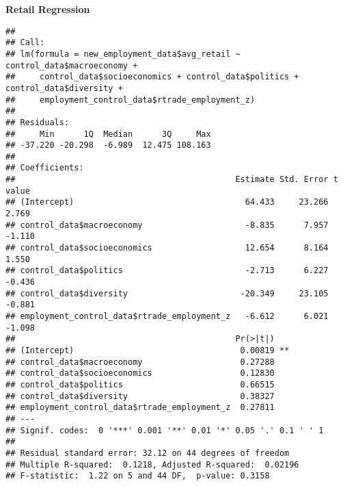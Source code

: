 \documentclass[
]{article}
\newenvironment{Shaded}{\begin{snugshade}}{\end{snugshade}}
\newcommand{\CommentTok}[1]{\textcolor[rgb]{0.56,0.35,0.01}{\textit{#1}}}
\newcommand{\FunctionTok}[1]{\textcolor[rgb]{0.13,0.29,0.53}{\textbf{#1}}}
\newcommand{\NormalTok}[1]{#1}
\newcommand{\OtherTok}[1]{\textcolor[rgb]{0.56,0.35,0.01}{#1}}
\newcommand{\SpecialCharTok}[1]{\textcolor[rgb]{0.81,0.36,0.00}{\textbf{#1}}}
\begin{document}
\textbf{Retail Regression}

\begin{Shaded}
\end{Shaded}

\begin{verbatim}
## 
## Call:
## lm(formula = new_employment_data$avg_retail ~ control_data$macroeconomy + 
##     control_data$socioeconomics + control_data$politics + control_data$diversity + 
##     employment_control_data$rtrade_employment_z)
## 
## Residuals:
##     Min      1Q  Median      3Q     Max 
## -37.220 -20.298  -6.989  12.475 108.163 
## 
## Coefficients:
##                                             Estimate Std. Error t value
## (Intercept)                                   64.433     23.266   2.769
## control_data$macroeconomy                     -8.835      7.957  -1.110
## control_data$socioeconomics                   12.654      8.164   1.550
## control_data$politics                         -2.713      6.227  -0.436
## control_data$diversity                       -20.349     23.105  -0.881
## employment_control_data$rtrade_employment_z   -6.612      6.021  -1.098
##                                             Pr(>|t|)   
## (Intercept)                                  0.00819 **
## control_data$macroeconomy                    0.27288   
## control_data$socioeconomics                  0.12830   
## control_data$politics                        0.66515   
## control_data$diversity                       0.38327   
## employment_control_data$rtrade_employment_z  0.27811   
## ---
## Signif. codes:  0 '***' 0.001 '**' 0.01 '*' 0.05 '.' 0.1 ' ' 1
## 
## Residual standard error: 32.12 on 44 degrees of freedom
## Multiple R-squared:  0.1218, Adjusted R-squared:  0.02196 
## F-statistic:  1.22 on 5 and 44 DF,  p-value: 0.3158
\end{verbatim}
\end{document}
